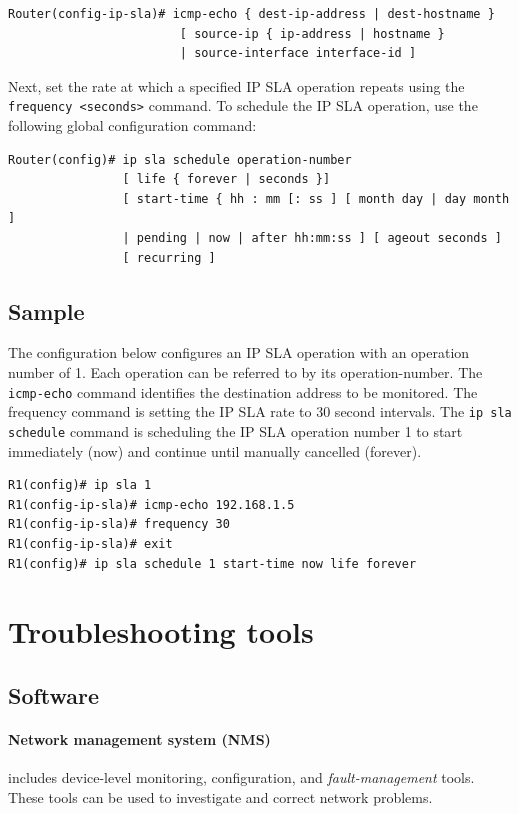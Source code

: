 \begin{verbatim}
Router(config-ip-sla)# icmp-echo { dest-ip-address | dest-hostname } 
						[ source-ip { ip-address | hostname } 
						| source-interface interface-id ] 
\end{verbatim}

Next, set the rate at which a specified IP SLA operation repeats using the \verb|frequency <seconds>| command. To schedule the IP SLA operation, use the following global configuration command:

\begin{verbatim}
Router(config)# ip sla schedule operation-number 
                [ life { forever | seconds }] 
                [ start-time { hh : mm [: ss ] [ month day | day month ] 
                | pending | now | after hh:mm:ss ] [ ageout seconds ] 
                [ recurring ] 
\end{verbatim}

\subsection{Sample}

The configuration below configures an IP SLA operation with an operation number of 1.  Each operation can be referred to by its operation-number. The \verb|icmp-echo| command identifies the destination address to be monitored. The frequency command is setting the IP SLA rate to 30 second intervals. The \verb|ip sla schedule| command is scheduling the IP SLA operation number 1 to start immediately (now) and continue until manually cancelled (forever).

\begin{verbatim}
R1(config)# ip sla 1
R1(config-ip-sla)# icmp-echo 192.168.1.5
R1(config-ip-sla)# frequency 30
R1(config-ip-sla)# exit
R1(config)# ip sla schedule 1 start-time now life forever
\end{verbatim}

\section{Troubleshooting tools}

\subsection{Software}

\paragraph{Network management system (NMS)}includes device-level monitoring, configuration, and \emph{fault-management} tools.  These tools can be used to investigate and correct network problems.

